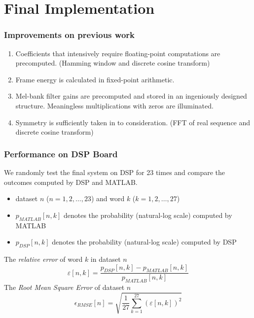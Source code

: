 \section{Final Implementation}

\begin{frame}
\frametitle{Improvements on previous work}
\begin{enumerate}
\item Coefficients that intensively require floating-point computations are precomputed. (Hamming window and discrete cosine transform)
\item Frame energy is calculated in fixed-point arithmetic.
\item Mel-bank filter gains are precomputed and stored in an ingeniously designed structure. Meaningless multiplications with zeros are illuminated.
\item Symmetry is sufficiently taken in to consideration. (FFT of real sequence and discrete cosine transform)
\end{enumerate}
\end{frame}

\begin{frame}
\frametitle{Performance on DSP Board}
We randomly test the final system on DSP for 23 times and compare the outcomes computed by DSP and MATLAB.
\begin{itemize}
	\item dataset $n$ ($n = 1, 2, \dots, 23$) and word $k$ ($k = 1, 2, \dots, 27$)
	\item $p_{MATLAB}[n, k]$ denotes the probability (natural-log scale) computed by MATLAB
	\item $p_{DSP}[n, k]$ denotes the probability (natural-log scale) computed by DSP
\end{itemize}

The \textit{relative error} of word $k$ in dataset $n$
\begin{equation}
\varepsilon[n, k] = \frac{p_{DSP}[n, k] - p_{MATLAB}[n, k]}{p_{MATLAB}[n, k]}
\end{equation}
The \textit{Root Mean Square Error} of dataset $n$
\begin{equation}
\epsilon_{RMSE}[n] = \sqrt{\frac{1}{27} \sum_{k = 1}^{27} (\varepsilon[n, k])^2}
\end{equation}
\end{frame}
